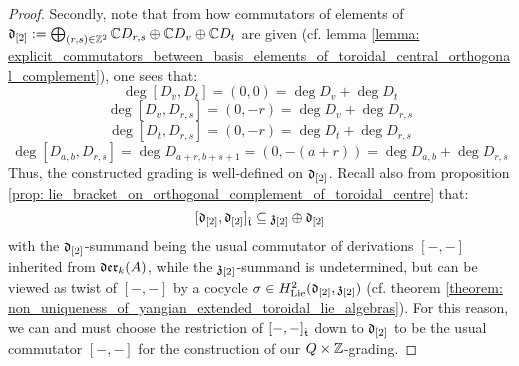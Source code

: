 \begin{proof}
                Secondly, note that from how commutators of elements of $\mathfrak{d}_{[2]} := \bigoplus_{(r, s) \in \mathbb{Z}^2} \mathbb{C} D_{r, s} \oplus \mathbb{C} D_v \oplus \mathbb{C} D_t$ are given (cf. lemma \ref{lemma: explicit_commutators_between_basis_elements_of_toroidal_central_orthogonal_complement}), one sees that:
                    $$\deg [D_v, D_t] = (0, 0) = \deg D_v + \deg D_t$$
                    $$\deg [D_v, D_{r, s}] = (0, -r) = \deg D_v + \deg D_{r, s}$$
                    $$\deg [D_t, D_{r, s}] = (0, -r) = \deg D_t + \deg D_{r, s}$$
                    $$\deg [D_{a, b}, D_{r, s}] = \deg D_{a + r, b + s + 1} = (0, -(a + r)) = \deg D_{a, b} + \deg D_{r, s}$$
                Thus, the constructed grading is well-defined on $\mathfrak{d}_{[2]}$. Recall also from proposition \ref{prop: lie_bracket_on_orthogonal_complement_of_toroidal_centre} that:
                    $$[\mathfrak{d}_{[2]}, \mathfrak{d}_{[2]}]_{\hat{\mathfrak{t}}} \subseteq \mathfrak{z}_{[2]} \oplus \mathfrak{d}_{[2]}$$
                with the $\mathfrak{d}_{[2]}$-summand being the usual commutator of derivations $[-, -]$ inherited from $\mathfrak{der}_{k}(A)$, while the $\mathfrak{z}_{[2]}$-summand is undetermined, but can be viewed as twist of $[-, -]$ by a cocycle $\sigma \in H^2_{\mathrm{Lie}}(\mathfrak{d}_{[2]}, \mathfrak{z}_{[2]})$ (cf. theorem \ref{theorem: non_uniqueness_of_yangian_extended_toroidal_lie_algebras}). For this reason, we can and must choose the restriction of $[-, -]_{\hat{\mathfrak{t}}}$ down to $\mathfrak{d}_{[2]}$ to be the usual commutator $[-, -]$ for the construction of our $Q \x \Z$-grading. 
            \end{proof}

